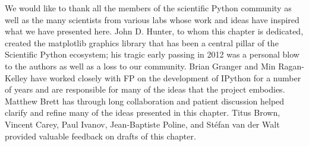 \documentclass[11pt,oneside,english]{article}
\begin{document}
We would like to thank all the members of the scientific Python community as
well as the many scientists from various labs whose work and ideas have inspired
what we have presented here.  John D. Hunter, to whom this chapter is dedicated,
created the matplotlib graphics library that has been a central pillar of the
Scientific Python ecosystem; his tragic early passing in 2012 was a personal
blow to the authors as well as a loss to our community.  Brian Granger and Min
Ragan-Kelley have worked closely with FP on the development of IPython for a
number of years and are responsible for many of the ideas that the project
embodies.  Matthew Brett has through long collaboration and patient
discussion helped clarify and refine many of the ideas presented in this
chapter.  Titus Brown, Vincent Carey, Paul Ivanov, Jean-Baptiste Poline, and
Stéfan van der Walt provided valuable feedback on drafts of this chapter.



\end{document}
